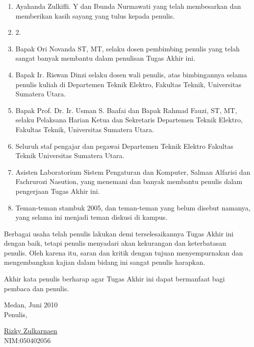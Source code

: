 \documentclass[12pt,a4paper,pdftex,final,oneside,titlepage]{book}
\begin{document}
\begin{enumerate}
\item Ayahanda Zulkifli. Y dan Ibunda Nurmawati yang telah membesarkan dan memberikan kasih sayang yang tulus kepada penulis.
\item 2.
\item Bapak Ori Novanda ST, MT, selaku dosen pembimbing penulis yang telah sangat banyak membantu dalam penulisan Tugas Akhir ini.
\item Bapak Ir. Riswan Dinzi selaku dosen wali penulis, atas bimbingannya selama penulis kuliah di Departemen Teknik Elektro, Fakultas Teknik, Universitas Sumatera Utara.
\item Bapak Prof. Dr. Ir. Usman S. Baafai dan Bapak Rahmad Fauzi, ST, MT, selaku Pelaksana Harian Ketua dan Sekretaris Departemen Teknik Elektro, Fakultas Teknik, Universitas Sumatera Utara.
\item Seluruh staf pengajar dan pegawai Departemen Teknik Elektro Fakultas Teknik Universitas Sumatera Utara.
\item Asisten Laboratorium Sistem Pengaturan dan Komputer, Salman Alfarisi dan Fachrurozi Nasution, yang menemani dan banyak membantu penulis dalam pengerjaan Tugas Akhir ini.
\item Teman-teman stambuk 2005,  dan teman-teman yang belum disebut namanya, yang selama ini menjadi teman diskusi di kampus.

\end{enumerate}
Berbagai usaha telah penulis lakukan demi terselesaikannya Tugas Akhir ini dengan baik, tetapi penulis menyadari akan kekurangan dan keterbatasan penulis. Oleh karena itu, saran dan kritik dengan tujuan menyempurnakan dan mengembangkan kajian dalam bidang ini sangat penulis harapkan.

Akhir kata penulis berharap agar Tugas Akhir ini dapat bermanfaat bagi pembaca dan penulis.

\vspace*{2cm} 
\begin{flushright} 
Medan,\hspace{0.2cm} Juni 2010 \hspace{1cm} \\ %
Penulis,\hspace{2.2cm}
\par 
\vspace*{1cm} 
\par \underline{Rizky Zulkarnaen}\\%
NIM:$050402056$ \hspace{0.6cm} \par
\end{flushright} 
\end{document}
